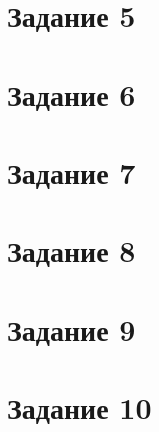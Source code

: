 \documentclass[a4paper, 12pt]{article}
\begin{document}
	\section*{Задание 5}
	\section*{Задание 6}
	\section*{Задание 7}
	\section*{Задание 8}
	\section*{Задание 9}
	\section*{Задание 10}
\end{document}
